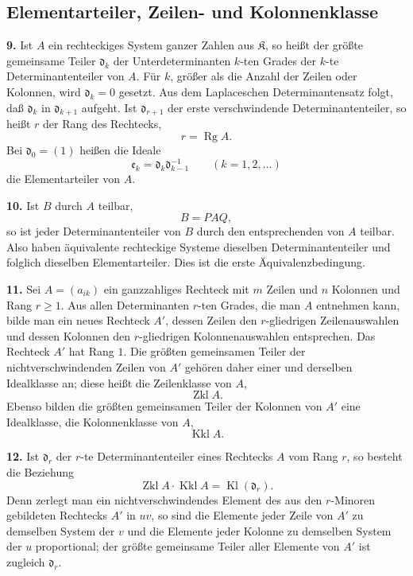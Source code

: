 \documentclass[11pt,a4paper]{article}
\newcommand{\K}{\mathfrak K}
\newcommand{\Kl}{\operatorname{Kl}}
\newcommand{\Zkl}{\operatorname{Zkl}}
\newcommand{\Kkl}{\operatorname{Kkl}}
\newcommand{\Rg}{\operatorname{Rg}}
\begin{document}
\subsection*{Elementarteiler, Zeilen- und Kolonnenklasse}

\textbf{9.} Ist \(A\) ein rechteckiges System ganzer Zahlen aus \(\K\), so heißt der größte gemeinsame Teiler \(\mathfrak d_k\) der Unterdeterminanten \(k\)-ten Grades der \(k\)-te Determinantenteiler von \(A\). Für \(k\), größer als die Anzahl der Zeilen oder Kolonnen, wird \(\mathfrak d_k=0\) gesetzt. Aus dem Laplaceschen Determinantensatz folgt, daß \(\mathfrak d_k\) in \(\mathfrak d_{k+1}\) aufgeht. Ist \(\mathfrak d_{r+1}\) der erste verschwindende Determinantenteiler, so heißt \(r\) der Rang des Rechtecks,
\[
 r=\Rg A.
\]
Bei \(\mathfrak d_0=(1)\) heißen die Ideale
\[
 \mathfrak e_k=\mathfrak d_k\mathfrak d_{k-1}^{-1}\qquad(k=1,2,\ldots)
\]
die Elementarteiler von \(A\).

\textbf{10.} Ist \(B\) durch \(A\) teilbar,
\[
 B=PAQ,
\]
so ist jeder Determinantenteiler von \(B\) durch den entsprechenden von \(A\) teilbar. Also haben äquivalente rechteckige Systeme dieselben Determinantenteiler und folglich dieselben Elementarteiler. Dies ist die erste Äquivalenzbedingung.

\textbf{11.} Sei \(A=(a_{ik})\) ein ganzzahliges Rechteck mit \(m\) Zeilen und \(n\) Kolonnen und Rang \(r\geq1\). Aus allen Determinanten \(r\)-ten Grades, die man \(A\) entnehmen kann, bilde man ein neues Rechteck \(A'\), dessen Zeilen den \(r\)-gliedrigen Zeilenauswahlen und dessen Kolonnen den \(r\)-gliedrigen Kolonnenauswahlen entsprechen. Das Rechteck \(A'\) hat Rang \(1\). Die größten gemeinsamen Teiler der nichtverschwindenden Zeilen von \(A'\) gehören daher einer und derselben Idealklasse an; diese heißt die Zeilenklasse von \(A\),
\[
 \Zkl A.
\]
Ebenso bilden die größten gemeinsamen Teiler der Kolonnen von \(A'\) eine Idealklasse, die Kolonnenklasse von \(A\),
\[
 \Kkl A.
\]

\textbf{12.} Ist \(\mathfrak d_r\) der \(r\)-te Determinantenteiler eines Rechtecks \(A\) vom Rang \(r\), so besteht die Beziehung
\[
 \Zkl A\cdot \Kkl A=\Kl(\mathfrak d_r). \tag{4}
\]
Denn zerlegt man ein nichtverschwindendes Element des aus den \(r\)-Minoren gebildeten Rechtecks \(A'\) in \(uv\), so sind die Elemente jeder Zeile von \(A'\) zu demselben System der \(v\) und die Elemente jeder Kolonne zu demselben System der \(u\) proportional; der größte gemeinsame Teiler aller Elemente von \(A'\) ist zugleich \(\mathfrak d_r\).
\end{document}
